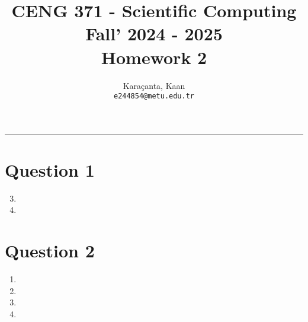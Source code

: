 \documentclass[11pt,a4paper, margin=1in]{article}
\author{
  Karaçanta, Kaan\\
  \texttt{e244854@metu.edu.tr}
}
\title{CENG 371 - Scientific Computing \\
Fall' 2024 - 2025 \\
Homework 2}
\date{}
\begin{document}
\maketitle

\noindent\rule{19cm}{1.2pt}


\section*{Question 1}

\begin{enumerate}
    \setcounter{enumi}{2}
    \item %
    
    \item %

\end{enumerate}


\section*{Question 2}

\begin{enumerate}
    
    \item
    
    \item
    
    \item
    
    \item

\end{enumerate}
\end{document}
